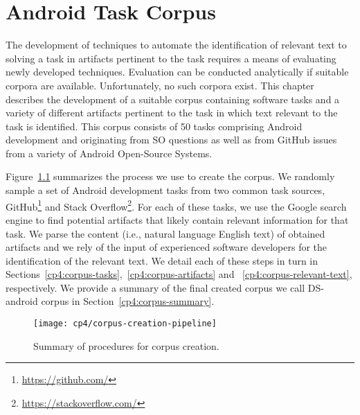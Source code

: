 \setcounter{chapter}{3}
\setcounter{rq}{1}


\chapter{Android Task Corpus}
\label{ch:android-corpus}





The development of techniques
to automate the identification of relevant text
to solving a task in artifacts
pertinent to the task requires a
means of evaluating newly developed
techniques. Evaluation can be conducted
analytically if suitable corpora are
available. Unfortunately, no such corpora
exist. This chapter describes the
development of a suitable corpus
containing
software tasks
and a variety of different artifacts pertinent
to the task in which text relevant to the
task is identified.
This corpus consists of 
50 tasks comprising Android development and originating from \acf{SO} questions
as well as from GitHub issues from a variety of Android Open-Source Systems.

Figure~\ref{fig:corpus-creation-pipeline}
summarizes the process we use to create the corpus.
We randomly sample a set of Android development tasks from two common
task sources, GitHub\footnote{\url{https://github.com/}} and Stack Overflow\footnote{\url{https://stackoverflow.com/}}.
For each of these tasks, we use the Google search engine to find potential artifacts that likely contain relevant
information for that task. 
We parse the content (i.e., natural language English text) of obtained artifacts 
and we rely of the input of experienced 
software developers for the identification of the relevant text.
We detail each of these steps in turn in 
Sections~\ref{cp4:corpus-tasks},~\ref{cp4:corpus-artifacts} and ~\ref{cp4:corpus-relevant-text},
respectively.
We provide a summary of the final created corpus we call \acs{DS-android} corpus in Section~\ref{cp4:corpus-summary}.



\begin{figure}
    \centering
    \texttt{[image: cp4/corpus-creation-pipeline]}
    \caption{Summary of procedures for corpus creation. }
    \label{fig:corpus-creation-pipeline}
\end{figure}

\clearpage
















